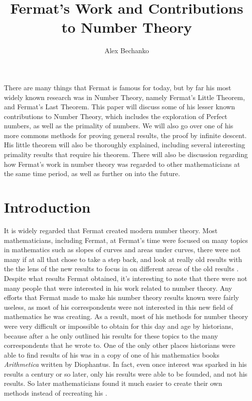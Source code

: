 \documentclass[11pt]{article}
\title{Fermat's Work and Contributions to Number Theory}
\author{Alex Bechanko}
\begin{document}
\maketitle
There are many things that Fermat is famous for today, but by far his most widely
known research was in Number Theory, namely Fermat's Little Theorem, and 
Fermat's Last Theorem.
This paper will discuss some of his lesser
known contributions to Number Theory, which includes the exploration of
Perfect numbers, as well as the primality of numbers.
We will also go over one of his more commons methods for proving general results,
the proof by infinite descent.
His little theorem will also be thoroughly explained, including several 
interesting primality results that require his theorem.
There will also be discussion regarding how Fermat's work in number
theory was regarded to other mathematicians at the same time period, as
well as further on into the future. 

\section*{Introduction}
It is widely regarded that Fermat created modern number theory.
Most mathematicians, including Fermat, at Fermat's time were focused
on many topics in mathematics such as slopes of curves and areas under curves,
there were not many if at all that chose to take a step back, and look at really
old results with the the lens of the new results to focus in on different areas
of the old results \cite{Mahoney}. 
Despite what results Fermat obtained, it's interesting to note that there were
not many people that were interested in his work related to number theory.
Any efforts that Fermat made to make his number theory results known were fairly
useless, as most of his correspondents were not interested in this new field of
mathematics he was creating.
As a result, most of his methods for number theory were very difficult or
impossible to obtain
for this day and age by historians, because after a he only outlined
his results for these topics to the many correspondents that he wrote
to.
One of the only other places historians were able to find results of his was in
a copy of one of his mathematics books \emph{Arithmetica} written by Diophantus.
In fact, even once interest was sparked in his results a century or so later,
only his results were able to be founded, and not his results.
So later mathematicians found it much easier to create their own methods
instead of recreating his \cite{Mahoney}.
\end{document}
